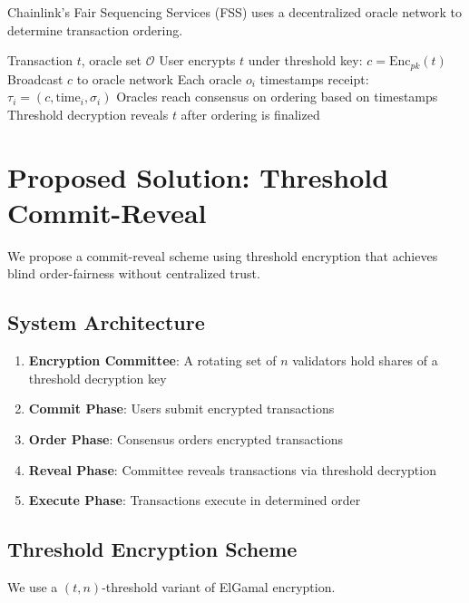 \documentclass[11pt,a4paper]{article}
\theoremstyle{definition}
\begin{document}
Chainlink's Fair Sequencing Services (FSS) uses a decentralized oracle network to determine transaction ordering.

\begin{algorithm}
\caption{Fair Sequencing Service}
\begin{algorithmic}[1]
\Require Transaction $t$, oracle set $\mathcal{O}$
\State User encrypts $t$ under threshold key: $c = \text{Enc}_{pk}(t)$
\State Broadcast $c$ to oracle network
\State Each oracle $o_i$ timestamps receipt: $\tau_i = (c, \text{time}_i, \sigma_i)$
\State Oracles reach consensus on ordering based on timestamps
\State Threshold decryption reveals $t$ after ordering is finalized
\end{algorithmic}
\end{algorithm}

\section{Proposed Solution: Threshold Commit-Reveal}

We propose a commit-reveal scheme using threshold encryption that achieves blind order-fairness without centralized trust.

\subsection{System Architecture}

\begin{enumerate}
    \item \textbf{Encryption Committee}: A rotating set of $n$ validators hold shares of a threshold decryption key
    \item \textbf{Commit Phase}: Users submit encrypted transactions
    \item \textbf{Order Phase}: Consensus orders encrypted transactions
    \item \textbf{Reveal Phase}: Committee reveals transactions via threshold decryption
    \item \textbf{Execute Phase}: Transactions execute in determined order
\end{enumerate}

\subsection{Threshold Encryption Scheme}

We use a $(t, n)$-threshold variant of ElGamal encryption.
\end{document}
